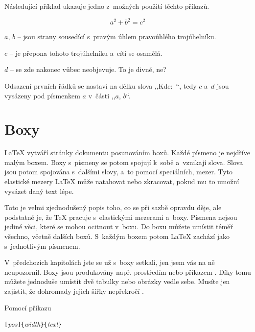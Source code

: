 \noindent Následující příklad ukazuje jedno z~možných použití těchto příkazů.

\begin{example}
\flushleft
\newenvironment{vardesc}[1]{%
  \settowidth{\parindent}{#1:\ }
  \makebox[0pt][r]{#1:\ }}{}

\begin{displaymath}
a^2+b^2=c^2
\end{displaymath}

\begin{vardesc}{Kde}$a$, 
$b$ -- jsou strany sousedící
s~pravým úhlem pravoúhlého
trojúhelníku.  

$c$ -- je přepona tohoto
trojúhelníku a~cítí se osamělá.

$d$ -- se zde nakonec vůbec
neobjevuje. To je divné, ne?
\end{vardesc}
\end{example}

Odsazení prvních řádků se nastaví na délku slova ,,Kde:\verb*+ +``, tedy $c$ a~$d$ jsou vysázeny pod písmenkem $a$ v~části ,,$a$, $b$``.

\section{Boxy}
\LaTeX{} vytváří stránky dokumentu posunováním boxů. Každé písmeno
je nejdříve malým boxem. Boxy s~písmeny se potom spojují k~sobě a~vznikají
slova. Slova jsou potom spojována s~dalšími slovy, a~to pomocí speciálních,
 mezer. Tyto elastické mezery \LaTeX{} může natahovat
nebo zkracovat, pokud mu to umožní vysázet daný text lépe.

Toto je velmi zjednodušený popis toho, co se při sazbě opravdu děje, ale
podstatné je, že \TeX{} pracuje s~elastickými mezerami a~boxy. Písmena
nejsou jediné věci, které se mohou ocitnout v~boxu. Do boxu můžete
umístit téměř všechno, včetně dalších boxů. S~každým boxem 
potom \LaTeX{} zachází jako s~jednotlivým písmenem.

V~předchozích kapitolách jste se už s~boxy setkali, jen jsem vás na ně
neupozornil. Boxy jsou produkovány např. prostředím  nebo
příkazem . Díky tomu můžete jednoduše umístit dvě tabulky
nebo obrázky vedle sebe. Musíte jen zajistit, že dohromady jejich
šířky nepřekročí .

Pomocí příkazu

\begin{lscommand}
\verb|[|\emph{pos}\verb|]{|\emph{width}\verb|}{|\emph{text}\verb|}|
\end{lscommand}

